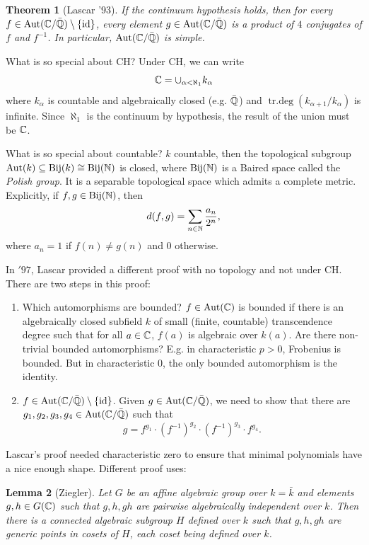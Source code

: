 \documentclass[A4paper, british, reqno]{amsart}
\theoremstyle{darkgreentheorem}
\newtheorem{thm}{Theorem}[section]
\newtheorem{lm}[thm]{Lemma}
\theoremstyle{darkbluedefinition}
\theoremstyle{darkredexample}
\theoremstyle{remark}
\DeclareMathOperator{\Aut}{Aut}
\DeclareMathOperator{\trdeg}{tr.deg}
\newcommand{\1}{\mathbbm{1}}
\newcommand{\id}{\mathrm{id}}
\newcommand{\sub}{\subseteq}
\begin{document}
\begin{thm}[Lascar '93]
    If the continuum hypothesis holds, then for every $f\in \Aut(\C/\bar{\Q})\setminus \{\id\}$, every element $g\in \Aut(\C/\bar{\Q})$ is a product of $4$ conjugates of $f$ and $f^{-1}$.
    In particular, $\Aut(\C/\bar{\Q})$ is simple.
\end{thm}

What is so special about CH?
Under CH, we can write
\[ \mathbb{C}=\cup_{\alpha < \aleph_{1}} k_{\alpha} \]
where $k_{\alpha}$ is countable and algebraically closed (e.g. $\bar{\mathbb{Q}}$) and $\trdeg(k_{\alpha+1}/k_{\alpha})$ is infinite.
Since $\aleph_{1}$ is the continuum by hypothesis, the result of the union must be $\mathbb{C}$.

What is so special about countable?
$k$ countable, then the topological subgroup $\Aut(k)\sub \operatorname{Bij}(k)\cong \operatorname{Bij}(\N)$ is closed, where $\operatorname{Bij}(\mathbb{N})$ is a Baired space called the \textit{Polish group}.
It is a separable topological space which admits a complete metric.
Explicitly, if $f,g\in \operatorname{Bij}(\mathbb{N})$, then
\[ d(f,g)=\sum_{n\in \mathbb{N}}\frac{a_{n}}{2^{n}}, \]
where $a_{n}=1$ if $f(n)\neq g(n)$ and $0$ otherwise.

In $'97$, Lascar provided a different proof with no topology and not under CH.
There are two steps in this proof:
\begin{enumerate}[label=Step \arabic*)]
    \item Which automorphisms are bounded?
	$f\in \Aut(\C)$ is bounded if there is an algebraically closed subfield $k$ of small (finite, countable) transcendence degree such that for all $a\in \mathbb{C}$, $f(a)$ is algebraic over $k(a)$.
	Are there non-trivial bounded automorphisms?
	E.g. in characteristic $p>0$, Frobenius is bounded.
	But in characteristic $0$, the only bounded automorphism is the identity.
    \item $f\in \Aut(\C/\bar{\Q})\setminus \{\id\}$.
	Given $g\in \Aut(\C/\bar{\Q})$, we need to show that there are $g_{1},g_{2},g_{3},g_{4}\in \Aut(\C/\bar{\Q})$ such that
	\[ g=f^{g_{1}}\cdot (f^{-1})^{g_{2}}\cdot (f^{-1})^{g_{3}}\cdot f^{g_{4}}. \]
\end{enumerate}

Lascar's proof needed characteristic zero to ensure that minimal polynomials have a nice enough shape.
Different proof uses:

\begin{lm}[Ziegler]
    Let $G$ be an affine algebraic group over $k=\bar{k}$ and elements $g,h\in G(\mathbb{C})$ such that $g,h, gh$ are pairwise algebraically independent over $k$.
    Then there is a connected algebraic subgroup $H$ defined over $k$ such that
    $g,h,gh$ are generic points in cosets of $H$, each coset being defined over $k$.
\end{lm}
\end{document}
